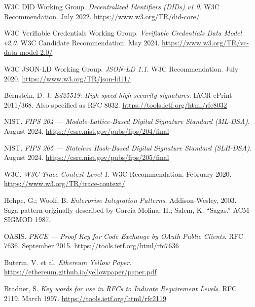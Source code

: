 \documentclass[11pt,a4paper]{article}
\begin{document}
\begin{enumerate}[label={[\arabic*]}, leftmargin=*, itemsep=4pt]
  \item W3C DID Working Group. \textit{Decentralized Identifiers (DIDs) v1.0}.
        W3C Recommendation. July 2022.
        \url{https://www.w3.org/TR/did-core/}

  \item W3C Verifiable Credentials Working Group. \textit{Verifiable Credentials
        Data Model v2.0}. W3C Candidate Recommendation. May 2024.
        \url{https://www.w3.org/TR/vc-data-model-2.0/}

  \item W3C JSON-LD Working Group. \textit{JSON-LD 1.1}.
        W3C Recommendation. July 2020.
        \url{https://www.w3.org/TR/json-ld11/}

  \item Bernstein, D. J. \textit{Ed25519: High-speed high-security signatures}.
        IACR ePrint 2011/368. Also specified as RFC 8032.
        \url{https://tools.ietf.org/html/rfc8032}

  \item NIST. \textit{FIPS 204 --- Module-Lattice-Based Digital Signature
        Standard (ML-DSA)}. August 2024.
        \url{https://csrc.nist.gov/pubs/fips/204/final}

  \item NIST. \textit{FIPS 205 --- Stateless Hash-Based Digital Signature
        Standard (SLH-DSA)}. August 2024.
        \url{https://csrc.nist.gov/pubs/fips/205/final}

  \item W3C. \textit{W3C Trace Context Level 1}.
        W3C Recommendation. February 2020.
        \url{https://www.w3.org/TR/trace-context/}

  \item Hohpe, G.; Woolf, B. \textit{Enterprise Integration Patterns}.
        Addison-Wesley, 2003. Saga pattern originally described by
        Garcia-Molina, H.; Salem, K. ``Sagas.'' ACM SIGMOD 1987.

  \item OASIS. \textit{PKCE --- Proof Key for Code Exchange by OAuth Public
        Clients}. RFC 7636. September 2015.
        \url{https://tools.ietf.org/html/rfc7636}

  \item Buterin, V. et al. \textit{Ethereum Yellow Paper}.
        \url{https://ethereum.github.io/yellowpaper/paper.pdf}

  \item Bradner, S. \textit{Key words for use in RFCs to Indicate Requirement
        Levels}. RFC 2119. March 1997.
        \url{https://tools.ietf.org/html/rfc2119}
\end{enumerate}
\end{document}
